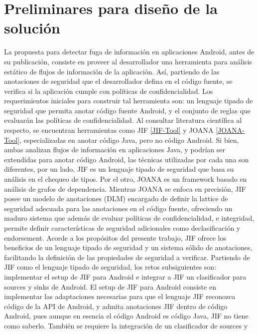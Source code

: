 \section{Preliminares para diseño de la solución}
\label{sec:propuesta-sol}
La propuesta para detectar fuga de información en aplicaciones Android, antes de
su publicación, consiste en proveer al desarrollador una herramienta para
análisis estático de flujos de información de la aplicación. Así, partiendo de
las anotaciones de seguridad que el desarrollador defina en el código fuente, se
verifica si la aplicación cumple con políticas de confidencialidad.\newline
Los requerimientos iniciales para construir tal herramienta son: un lenguaje
tipado de seguridad que permita anotar código fuente Android, y el conjunto de
reglas que evaluarán las políticas de confidencialidad.\newline 
Al consultar literatura científica al respecto, se encuentran herramientas como
JIF \ref{JIF-Tool} y JOANA \ref{JOANA-Tool}, especializadas en anotar código
Java, pero no código Android.
Si bien, ambas analizan flujos de información en aplicaciones Java, y podrían
ser extendidas para anotar código Android, las técnicas utilizadas por cada una
son diferentes, por un lado, JIF es un lenguaje tipado de seguridad que basa su
análisis en el chequeo de tipos. Por el otro, JOANA es un framework basado en
análisis de grafos de dependencia. Mientras JOANA se enfoca en precisión, JIF
posee un modelo de anotaciones (DLM) encargado de definir la lattice de
seguridad adecuada para las anotaciones en el código fuente, ofreciendo un
maduro sistema que además de evaluar políticas de confidencialidad, e
integridad, permite definir características de seguridad adicionales como
declasificación y endorsement.
Acorde a los propósitos del presente trabajo, JIF ofrece los beneficios de un
lenguaje tipado de seguridad y un sistema  sólido  de anotaciones, facilitando
la definición de las propiedades de seguridad a verificar.\newline 
Partiendo de JIF como el lenguaje tipado de seguridad, los retos subsiguientes
son: implementar el setup de JIF para Android e integrar a JIF un clasificador
para sources y sinks de Android. El setup de JIF para Android consiste en
implementar las adaptaciones necesarias para que el lenguaje JIF reconozca
código de la API de Android, y admita anotaciones JIF dentro de código
Android, pues aunque en esencia el código Android es código Java, JIF no tiene
como saberlo. También se requiere la integración de un clasificador de sources y
